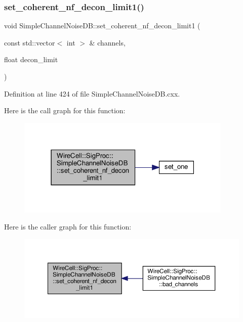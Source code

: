 \subsubsection{\texorpdfstring{set\+\_\+coherent\+\_\+nf\+\_\+decon\+\_\+limit1()}{set\_coherent\_nf\_decon\_limit1()}}
{\footnotesize\ttfamily void Simple\+Channel\+Noise\+D\+B\+::set\+\_\+coherent\+\_\+nf\+\_\+decon\+\_\+limit1 (\begin{DoxyParamCaption}\item[{const std\+::vector$<$ int $>$ \&}]{channels,  }\item[{float}]{decon\+\_\+limit }\end{DoxyParamCaption})}



Definition at line 424 of file Simple\+Channel\+Noise\+D\+B.\+cxx.

Here is the call graph for this function\+:
\nopagebreak
\begin{figure}[H]
\begin{center}
\leavevmode
\includegraphics[width=291pt]{class_wire_cell_1_1_sig_proc_1_1_simple_channel_noise_d_b_ab58c3af3127913b121bb9bee04cc56d9_cgraph}
\end{center}
\end{figure}
Here is the caller graph for this function\+:
\nopagebreak
\begin{figure}[H]
\begin{center}
\leavevmode
\includegraphics[width=350pt]{class_wire_cell_1_1_sig_proc_1_1_simple_channel_noise_d_b_ab58c3af3127913b121bb9bee04cc56d9_icgraph}
\end{center}
\end{figure}
\mbox{\label{class_wire_cell_1_1_sig_proc_1_1_simple_channel_noise_d_b_a045c735c118842078036c1619a637525}} 
